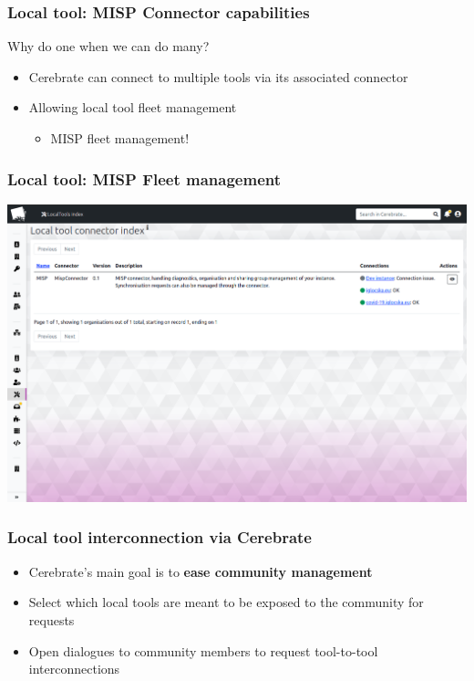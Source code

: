 \begin{frame}
\frametitle{Local tool: MISP Connector capabilities}
    Why do one when we can do many?
    \begin{itemize}
        \item Cerebrate can connect to multiple tools via its associated connector
        \item Allowing local tool fleet management
        \begin{itemize}
            \item MISP fleet management!
        \end{itemize}
    \end{itemize}
\end{frame}

\begin{frame}
    \frametitle{Local tool: MISP Fleet management}
    \begin{center}
        \includegraphics[width=0.97\linewidth]{pictures/localtools-index.png}
    \end{center}
\end{frame}

\begin{frame}
\frametitle{Local tool interconnection via Cerebrate}
    \begin{itemize}
        \item Cerebrate's main goal is to \textbf{ease community management}
        \item Select which local tools are meant to be exposed to the community for requests
        \item Open dialogues to community members to request tool-to-tool interconnections
    \end{itemize}
\end{frame}

